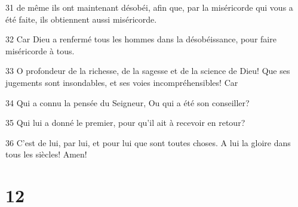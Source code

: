 \par 31 de même ils ont maintenant désobéi, afin que, par la miséricorde qui vous a été faite, ils obtiennent aussi miséricorde.
\par 32 Car Dieu a renfermé tous les hommes dans la désobéissance, pour faire miséricorde à tous.
\par 33 O profondeur de la richesse, de la sagesse et de la science de Dieu! Que ses jugements sont insondables, et ses voies incompréhensibles! Car
\par 34 Qui a connu la pensée du Seigneur, Ou qui a été son conseiller?
\par 35 Qui lui a donné le premier, pour qu'il ait à recevoir en retour?
\par 36 C'est de lui, par lui, et pour lui que sont toutes choses. A lui la gloire dans tous les siècles! Amen!

\chapter{12}

